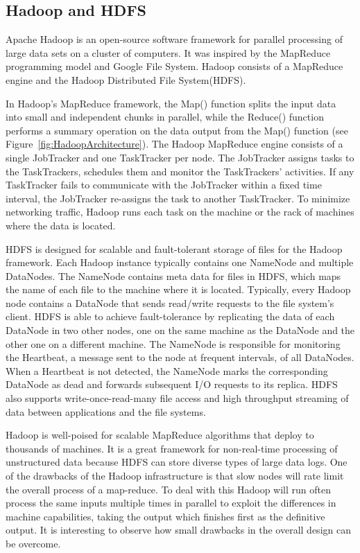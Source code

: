 \documentclass[a4paper]{article}
\begin{document}
\subsection{Hadoop and HDFS}
Apache Hadoop is an open-source software framework for parallel processing of large data sets on a cluster of computers. It was inspired by the MapReduce programming model and Google File System. Hadoop consists of a MapReduce engine and the Hadoop Distributed File System(HDFS).

In Hadoop's MapReduce framework, the Map() function splits the input data into small and independent chunks in parallel, while the Reduce() function performs a summary operation on the data output from the Map() function (see Figure~\ref{fig:HadoopArchitecture}). The Hadoop MapReduce engine consists of a single JobTracker and one TaskTracker per node. The JobTracker assigns tasks to the TaskTrackers, schedules them and monitor the TaskTrackers' activities. If any TaskTracker fails to communicate with the JobTracker within a fixed time interval, the JobTracker re-assigns the task to another TaskTracker. To minimize networking traffic, Hadoop runs each task on the machine or the rack of machines where the data is located. 

HDFS is designed for scalable and fault-tolerant storage of files for the Hadoop framework. Each Hadoop instance typically contains one NameNode and multiple DataNodes. The NameNode contains meta data for files in HDFS, which maps the name of each file to the machine where it is located. Typically, every Hadoop node contains a DataNode that sends read/write requests to the file system's client. HDFS is able to achieve fault-tolerance by replicating the data of each DataNode in two other nodes, one on the same machine as the DataNode and the other one on a different machine. The NameNode is responsible for monitoring the Heartbeat, a message sent to the node at frequent intervals, of all DataNodes. When a Heartbeat is not detected, the NameNode marks the corresponding DataNode as dead and forwards subsequent I/O requests to its replica. HDFS also supports write-once-read-many file access and high throughput streaming of data between applications and the file systems.

Hadoop is well-poised for scalable MapReduce algorithms that deploy to thousands of machines. It is a great framework for non-real-time processing of unstructured data because HDFS can store diverse types of large data logs. One of the drawbacks of the Hadoop infrastructure is that slow nodes will rate limit the overall process of a map-reduce.  To deal with this Hadoop will run often process the same inputs multiple times in parallel to exploit the differences in machine capabilities, taking the output which finishes first as the definitive output.  It is interesting to observe how small drawbacks in the overall design can be overcome.
\end{document}
